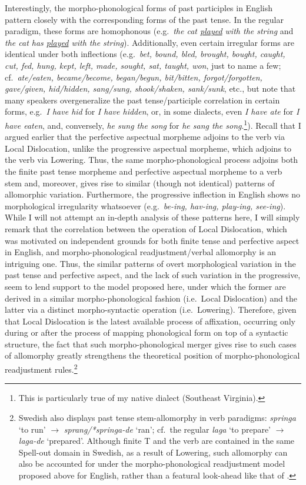 Interestingly, the morpho-phonological forms of past participles in English pattern closely with the corresponding forms of the past tense. In the regular paradigm, these forms are homophonous (e.g.\ {\it the cat \underline{played} with the string} and {\it the cat has \underline{played} with the string}). Additionally, even certain irregular forms are identical under both inflections (e.g.\ \textit{bet, bound, bled, brought, bought, caught, cut, fed, hung, kept, left, made, sought, sat, taught, won}, just to name a few; cf.\ \textit{ate/eaten, became/become, began/begun, bit/bitten, forgot/forgotten, gave/given, hid/hidden, sang/sung, shook/shaken, sank/sunk}, etc., but note that many speakers overgeneralize the past tense/participle correlation in certain forms, e.g.\ \textit{I have hid} for \textit{I have hidden}, or, in some dialects, even {\it I have ate} for {\it I have eaten}, and, conversely, {\it he sung the song} for {\it he sang the song}.\footnote{This is particularly true of my native dialect (Southeast Virginia).}). Recall that I argued earlier that the perfective aspectual morpheme adjoins to the verb via Local Dislocation, unlike the progressive aspectual morpheme, which adjoins to the verb via Lowering. Thus, the same morpho-phonological process adjoins both the finite past tense morpheme and perfective aspectual morpheme to a verb stem and, moreover, gives rise to similar (though not identical) patterns of allomorphic variation. Furthermore, the progressive inflection in English shows no morphological irregularity whatsoever (e.g.\ \textit{be-ing, hav-ing, play-ing, see-ing}). While I will not attempt an in-depth analysis of these patterns here, I will simply remark that the correlation between the operation of Local Dislocation, which was motivated on independent grounds for both finite tense and perfective aspect in English, and morpho-phonological readjustment/verbal allomorphy is an intriguing one. Thus, the similar patterns of overt morphological variation in the past tense and perfective aspect, and the lack of such variation in the progressive, seem to lend support to the model proposed here, under which the former are derived in a similar morpho-phonological fashion (i.e.\ Local Dislocation) and the latter via a distinct morpho-syntactic operation (i.e.\ Lowering). Therefore, given that Local Dislocation is the latest available process of affixation, occurring only during or after the process of mapping phonological form on top of a syntactic structure, the fact that such morpho-phonological merger gives rise to such cases of allomorphy greatly strengthens the theoretical position of morpho-phonological readjustment rules.\footnote{Swedish also displays past tense stem-allomorphy in verb paradigms: {\it springa} `to run' $\rightarrow$ {\it sprang/*springa-de} `ran'; cf.\ the regular {\it laga} `to prepare' $\rightarrow$ {\it laga-de} `prepared'. Although finite T and the verb are contained in the same Spell-out domain in Swedish, as a result of Lowering, such allomorphy can also be accounted for under the morpho-phonological readjustment model proposed above for English, rather than a featural look-ahead like that of .}

